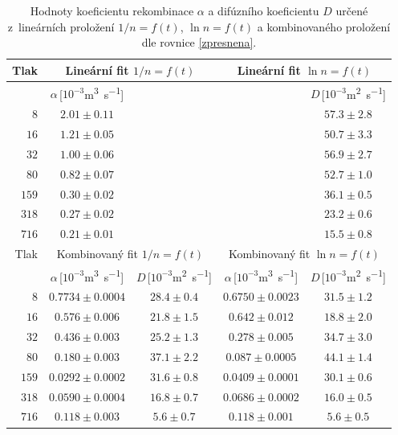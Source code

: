 \documentclass[a4paper,12pt]{article}
\begin{document}
\begin{table}[h]
	\centering
	\caption{Hodnoty koeficientu rekombinace $\alpha$ a difúzního koeficientu 
	$D$ určené z~lineárních proložení $1/n = f(t)$, $\ln n = f(t)$ a 
	kombinovaného proložení dle rovnice \eqref{zpresnena}.}
	\label{table:koef}
	\begin{tabular}{|r|c|c|c|c|}
		\hline
		Tlak & \multicolumn{2}{c|}{Lineární fit $1/n = f(t)$} & 
		\multicolumn{2}{c|}{Lineární fit $\ln n = f(t)$} \\ \hline
		[Pa] & $\alpha$\,[$10^{-3}$\si{\meter\cubed\per\second}] &&& 
		$D$\,[$10^{-3}$\si{\metre^2\second^{-1}}] \\ \hline
		$8$ & $2.01\pm0.11$ &&& $57.3\pm2.8$   
		\\ \hline
		$16$ & $1.21\pm0.05$ &&& $50.7\pm3.3$ 
		\\ \hline
		$32$ & $1.00\pm0.06$ &&& $56.9\pm2.7$ 
		\\ \hline
		$80$ & $0.82\pm0.07$ &&& $52.7\pm1.0$ 
		\\ \hline
		$159$ & $0.30\pm0.02$ &&& $36.1\pm0.5$ 
		\\ \hline
		$318$ & $0.27\pm0.02$ &&& $23.2\pm0.6$ 
		\\ \hline
		$716$ & $0.21\pm0.01$ &&& $15.5\pm0.8$ 
		\\ \hline\hline
		Tlak & \multicolumn{2}{c|}{Kombinovaný fit $1/n = f(t)$} & 
		\multicolumn{2}{c|}{Kombinovaný fit $\ln n = f(t)$} \\ \hline
		[Pa] & 
		$\alpha$\,[$10^{-3}$\si{\meter\cubed\per\second}] & 
		$D$\,[$10^{-3}$\si{\metre^2\second^{-1}}] & 
		$\alpha$\,[$10^{-3}$\si{\meter\cubed\per\second}] & 
		$D$\,[$10^{-3}$\si{\metre^2\second^{-1}}] \\ \hline
		$8$ & $0.7734\pm0.0004$ & $28.4\pm0.4$ & 
		$0.6750\pm0.0023$ & $31.5\pm1.2$ 
		\\ \hline
		$16$ & $0.576\pm0.006$ & $21.8\pm1.5$ & 
		$0.642\pm0.012$ & $18.8\pm2.0$
		\\ \hline
		$32$ & $0.436\pm0.003$ & $25.2\pm1.3$ & 
		$0.278\pm0.005$ & $34.7\pm3.0$
		\\ \hline
		$80$ & $0.180\pm0.003$ & $37.1\pm2.2$ & 
		$0.087\pm0.0005$ & $44.1\pm1.4$
		\\ \hline
		$159$ & $0.0292\pm0.0002$ & $31.6\pm0.8$ 
		& $0.0409\pm0.0001$ & $30.1\pm0.6$
		\\ \hline
		$318$ & $0.0590\pm0.0004$ & $16.8\pm0.7$ 
		& $0.0686\pm0.0002$ & $16.0\pm0.5$
		\\ \hline
		$716$ & $0.118\pm0.003$ & $5.6\pm0.7$ & 
		$0.118\pm0.001$ & $5.6\pm0.5$
		\\ \hline
	\end{tabular}
\end{table}
\clearpage
\end{document}
